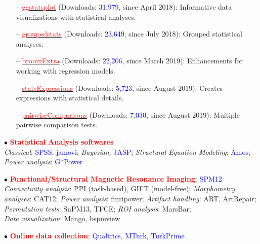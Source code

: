 \documentclass[10pt]{article}
\begin{document}
	\begin{itemize}
	\itemsep-0.1em
	\item[--] \href{https://indrajeetpatil.github.io/ggstatsplot/}{\textcolor{red}{ggstatsplot}} (Downloads: \textcolor{blue}{31,979}, since April 2018): Informative data visualizations with statistical analyses.
	\item[--] \href{https://indrajeetpatil.github.io/groupedstats/}{\textcolor{red}{groupedstats}} (Downloads: \textcolor{blue}{23,649}, since July 2018): Grouped statistical analyses.
	\item[--] \href{https://indrajeetpatil.github.io/groupedstats/}{\textcolor{red}{broomExtra}} (Downloads: \textcolor{blue}{22,206}, since March 2019): Enhancements for working with regression models.
	\item[--] \href{https://indrajeetpatil.github.io/statsExpressions/}{\textcolor{red}{statsExpressions}} (Downloads: \textcolor{blue}{5,723}, since August 2019): Creates expressions with statistical details.
	\item[--] \href{https://indrajeetpatil.github.io/pairwiseComparisons/}{\textcolor{red}{pairwiseComparisons}} (Downloads: \textcolor{blue}{7,030}, since August 2019): Multiple pairwise comparison tests.
	\end{itemize}
	

	$\bullet$ \textcolor{red}{\textbf{Statistical Analysis softwares}}\\
	\hspace*{0.1in}\textit{Classical}: \textcolor{blue}{SPSS}, \textcolor{blue}{jamovi}; \textit{Bayesian}: \textcolor{blue}{JASP}; \textit{Structural Equation Modeling}: \textcolor{blue}{Amos}; \textit{Power analysis}: \textcolor{blue}{G*Power}
	\miniskip
	
	$\bullet$ \textcolor{red}{\textbf{Functional/Structural Magnetic Resonance Imaging}}: \textcolor{blue}{SPM12}\\
	\hspace*{0.1in}\textit{Connectivity analysis}: PPI (task-based), GIFT (model-free); \textit{Morphometry analyses}: CAT12; \textit{Power analysis}: \hspace*{0.1in}fmripower; \textit{Artifact handling}: ART, ArtRepair; \textit{Permutation tests}: SnPM13, TFCE; \textit{ROI analysis}: MarsBar;\\ 
	\hspace*{0.1in}\textit{Data visualization}: Mango, bspmview
	\miniskip
	
	$\bullet$ \textcolor{red}{\textbf{Online data collection}}: \textcolor{blue}{Qualtrics}, \textcolor{blue}{MTurk}, \textcolor{blue}{TurkPrime}\\
	\miniskip
	
\end{document}
